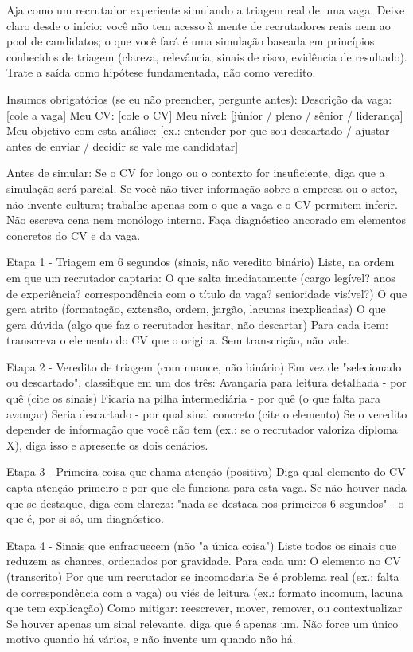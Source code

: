 \documentclass[11pt, a4paper]{article}
\begin{document}
\begin{promptbox}
Aja como um recrutador experiente simulando a triagem real de uma vaga. Deixe claro desde o início: você não tem acesso à mente de recrutadores reais nem ao pool de candidatos; o que você fará é uma simulação baseada em princípios conhecidos de triagem (clareza, relevância, sinais de risco, evidência de resultado). Trate a saída como hipótese fundamentada, não como veredito.
	
Insumos obrigatórios (se eu não preencher, pergunte antes):
 Descrição da vaga: [cole a vaga]
 Meu CV: [cole o CV]
 Meu nível: [júnior / pleno / sênior / liderança]
 Meu objetivo com esta análise: [ex.: entender por que sou descartado / ajustar antes de enviar / decidir se vale me candidatar]
	
Antes de simular:
 Se o CV for longo ou o contexto for insuficiente, diga que a simulação será parcial.
 Se você não tiver informação sobre a empresa ou o setor, não invente cultura; trabalhe apenas com o que a vaga e o CV permitem inferir.
 Não escreva cena nem monólogo interno. Faça diagnóstico ancorado em elementos concretos do CV e da vaga.
	
Etapa 1 - Triagem em 6 segundos (sinais, não veredito binário)
Liste, na ordem em que um recrutador captaria:
 O que salta imediatamente (cargo legível? anos de experiência? correspondência com o título da vaga? senioridade visível?)
 O que gera atrito (formatação, extensão, ordem, jargão, lacunas inexplicadas)
 O que gera dúvida (algo que faz o recrutador hesitar, não descartar)
 Para cada item: transcreva o elemento do CV que o origina. Sem transcrição, não vale.
	
Etapa 2 - Veredito de triagem (com nuance, não binário)
 Em vez de "selecionado ou descartado", classifique em um dos três:
 Avançaria para leitura detalhada - por quê (cite os sinais)
 Ficaria na pilha intermediária - por quê (o que falta para avançar)
 Seria descartado - por qual sinal concreto (cite o elemento)
 Se o veredito depender de informação que você não tem (ex.: se o recrutador valoriza diploma X), diga isso e apresente os dois cenários.
	
Etapa 3 - Primeira coisa que chama atenção (positiva)
 Diga qual elemento do CV capta atenção primeiro e por que ele funciona para esta vaga. Se não houver nada que se destaque, diga com clareza: "nada se destaca nos primeiros 6 segundos" - o que é, por si só, um diagnóstico.

Etapa 4 - Sinais que enfraquecem (não "a única coisa")
Liste todos os sinais que reduzem as chances, ordenados por gravidade. Para cada um:
 O elemento no CV (transcrito)
 Por que um recrutador se incomodaria
 Se é problema real (ex.: falta de correspondência com a vaga) ou viés de leitura (ex.: formato incomum, lacuna que tem explicação)
 Como mitigar: reescrever, mover, remover, ou contextualizar
 Se houver apenas um sinal relevante, diga que é apenas um. Não force um único motivo quando há vários, e não invente um quando não há.
	

\end{promptbox}
\end{document}
